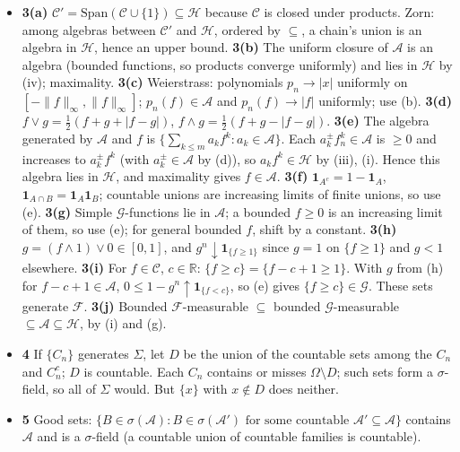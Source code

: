 \documentclass[10pt]{article}
\newcommand{\A}{\mathcal{A}}
\newcommand{\R}{\mathbb{R}}
\newcommand{\norm}[1]{\lVert {#1} \rVert}
\newcommand{\Span}{\text{Span}}
\begin{document}
\begin{itemize}[leftmargin=1.5em, itemsep=4pt]
\item \textbf{3(a)} $\mathcal C'=\Span(\mathcal C\cup\{1\})\subseteq\mathcal H$ because $\mathcal C$ is closed under products. %
  Zorn: among algebras between $\mathcal C'$ and $\mathcal H$, ordered by $\subseteq$, a chain's union is an algebra in $\mathcal H$, hence an upper bound.
  \textbf{3(b)} The uniform closure of $\A$ is an algebra (bounded functions, so products converge uniformly) and lies in $\mathcal H$ by (iv); maximality.
  \textbf{3(c)} Weierstrass: polynomials $p_n\to|x|$ uniformly on $[-\norm{f}_\infty,\norm{f}_\infty]$; $p_n(f)\in\A$ and $p_n(f)\to|f|$ uniformly; use (b).
  \textbf{3(d)} $f\vee g=\tfrac12(f+g+|f-g|)$, $f\wedge g=\tfrac12(f+g-|f-g|)$.
  \textbf{3(e)} The algebra generated by $\A$ and $f$ is $\{\sum_{k\le m}a_kf^k: a_k\in\A\}$. Each $a_k^\pm f_n^k\in\A$ is $\ge0$ and increases to $a_k^\pm f^k$ (with $a_k^\pm\in\A$ by (d)), so $a_kf^k\in\mathcal H$ by (iii), (i). Hence this algebra lies in $\mathcal H$, and maximality gives $f\in\A$.
  \textbf{3(f)} $\mathbf 1_{A^c}=1-\mathbf 1_A$, $\mathbf 1_{A\cap B}=\mathbf 1_A\mathbf 1_B$; countable unions are increasing limits of finite unions, so use (e).
  \textbf{3(g)} Simple $\mathcal G$-functions lie in $\A$; a bounded $f\ge0$ is an increasing limit of them, so use (e); for general bounded $f$, shift by a constant.
  \textbf{3(h)} $g=(f\wedge1)\vee0\in[0,1]$, and $g^n\downarrow\mathbf 1_{\{f\ge1\}}$ since $g=1$ on $\{f\ge1\}$ and $g<1$ elsewhere.
  \textbf{3(i)} For $f\in\mathcal C$, $c\in\R$: $\{f\ge c\}=\{f-c+1\ge1\}$. With $g$ from (h) for $f-c+1\in\A$, $0\le1-g^n\uparrow\mathbf 1_{\{f<c\}}$, so (e) gives $\{f\ge c\}\in\mathcal G$. These sets generate $\mathcal F$.
  \textbf{3(j)} Bounded $\mathcal F$-measurable $\subseteq$ bounded $\mathcal G$-measurable $\subseteq\A\subseteq\mathcal H$, by (i) and (g).
 
\item \textbf{4} If $\{C_n\}$ generates $\Sigma$, let $D$ be the union of the countable sets among the $C_n$ and $C_n^c$; $D$ is countable. Each $C_n$ contains or misses $\Omega\setminus D$; such sets form a $\sigma$-field, so all of $\Sigma$ would. But $\{x\}$ with $x\notin D$ does neither.
 
\item \textbf{5} Good sets: $\{B\in\sigma(\A): B\in\sigma(\A')\text{ for some countable }\A'\subseteq\A\}$ contains $\A$ and is a $\sigma$-field (a countable union of countable families is countable).
\end{itemize}
 
\end{document}
